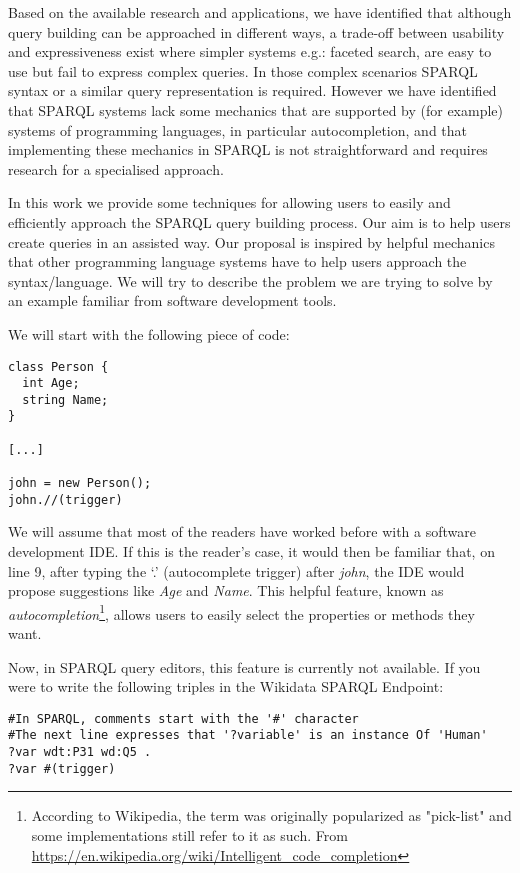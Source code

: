 Based on the available research and applications, we have identified that although query building can be approached in different ways, 
a trade-off between usability and expressiveness exist where simpler systems e.g.: 
faceted search, are easy to use but fail to express complex queries. 
In those complex scenarios SPARQL syntax or a similar query representation is required. 
However we have identified that SPARQL systems lack some mechanics that are supported by (for example) systems of programming languages, 
in particular autocompletion, and that implementing these mechanics in SPARQL is not straightforward and requires research for a specialised approach.

In this work we provide some techniques for allowing users to easily and efficiently approach the SPARQL query building process. 
Our aim is to help users create queries in an assisted way. 
Our proposal is inspired by helpful mechanics that other programming language systems have to help users approach the syntax/language. 
We will try to describe the problem we are trying to solve by an example familiar from software development tools.

We will start with the following piece of code:
\begin{verbatim}
class Person {
  int Age;
  string Name;
}

[...]

john = new Person();
john.//(trigger)
\end{verbatim}

We will assume that most of the readers have worked before with a software development IDE. 
If this is the reader’s case, it would then be familiar that, on line 9, after typing the ‘.’ (autocomplete trigger) after \textit{john}, 
the IDE would propose suggestions like \textit{Age} and \textit{Name}. 
This helpful feature, known as \textit{autocompletion}\footnote{According to Wikipedia, the term was originally popularized as "pick-list" and some implementations still refer to it as such. 
From \url{https://en.wikipedia.org/wiki/Intelligent_code_completion}}, allows users to easily select the properties or methods they want. 

Now, in SPARQL query editors, this feature is currently not available. 
If you were to write the following triples in the Wikidata SPARQL Endpoint:

\begin{verbatim}
#In SPARQL, comments start with the '#' character
#The next line expresses that '?variable' is an instance Of 'Human' 
?var wdt:P31 wd:Q5 .
?var #(trigger)
\end{verbatim}

